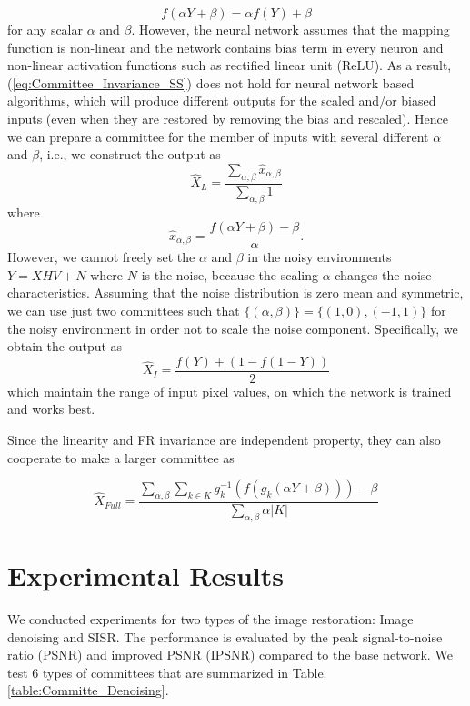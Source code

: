 \documentclass[journal]{IEEEtran}
\begin{document}
\begin{equation}
\label{eq:Committee_Invariance_SS}
f(\alpha Y + \beta) = \alpha f(Y) + \beta
\end{equation}
for any scalar $\alpha$ and $\beta$. 
However, the neural network assumes that the mapping function is 
non-linear and the network contains bias term in every neuron and 
non-linear activation functions such as rectified linear unit (ReLU). 
As a result,
(\ref{eq:Committee_Invariance_SS}) does not hold for neural network 
based algorithms, which will produce different outputs for 
the scaled and/or biased inputs (even when they are 
restored by removing the bias and rescaled). Hence we can prepare 
a committee for the member of inputs with several different  $\alpha$ and $\beta$,
i.e., we construct the output as
\begin{equation}
\label{eq:Committee_SS}
\hat{X}_{L} = \frac{\sum_{\alpha, \beta}\hat{x}_{\alpha, \beta}}{\sum_{\alpha, \beta}1}
\end{equation}
where
\begin{equation}
\label{eq:Committee_SS2}
\hat{x}_{\alpha, \beta} = \frac{f(\alpha Y + \beta) - \beta}{\alpha}.
\end{equation}
However, we cannot freely set the $\alpha$ and $\beta$
in the noisy environments $Y = XHV + N$ where $N$ is the noise,
because the scaling $\alpha$ changes the noise characteristics. 
Assuming that the noise distribution is zero mean and symmetric,
we can use just two committees such that  $\{(\alpha, \beta)\} = \{(1, 0), (-1, 1)\}$
for the noisy environment in order not to scale the noise component.
Specifically, we obtain the output as
\begin{equation}
\label{eq:Committee_Inv}
\hat{X}_{I} = \frac{f(Y)+(1-f(1-Y))}{2}
\end{equation}
which maintain the range of input pixel values, on which the network is 
trained and works best.

Since the linearity and FR invariance are independent property, 
they can also cooperate to make a larger committee as 

\begin{equation}
\hat{X}_{Full} = \frac{\sum_{\alpha, \beta}\sum_{k\in K}g_{k}^{-1}(f(g_{k}(\alpha Y+ \beta)))-\beta}{\sum_{\alpha, \beta}\alpha\left| K \right|}
\label{eq:Committee_FULL_Result}
\end{equation}


\section{Experimental Results}
We conducted experiments for two types of the image restoration: Image denoising and 
SISR. The performance is evaluated by the peak signal-to-noise ratio (PSNR) 
\cite{gonzalez2008digital} and improved PSNR (IPSNR) compared to the base network. 
We test 6 types of committees that are summarized in Table. \ref{table:Committe_Denoising}.
\end{document}
